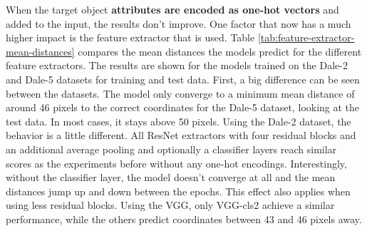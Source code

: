 When the target object \textbf{attributes are encoded as one-hot vectors} and added to the input, the results don't improve.
One factor that now has a much higher impact is the feature extractor that is used.
Table \ref{tab:feature-extractor-mean-distances} compares the mean distances the models predict for the different feature extractors.
The results are shown for the models trained on the Dale-2 and Dale-5 datasets for training and test data.
First, a big difference can be seen between the datasets.
The model only converge to a minimum mean distance of around 46 pixels to the correct coordinates for the Dale-5 dataset, looking at the test data.
In most cases, it stays above 50 pixels.
Using the Dale-2 dataset, the behavior is a little different.
All ResNet extractors with four residual blocks and an additional average pooling and optionally a classifier layers reach similar scores as the experiments before without any one-hot encodings.
Interestingly, without the classifier layer, the model doesn't converge at all and the mean distances jump up and down between the epochs.
This effect also applies when using less residual blocks.
Using the VGG, only VGG-cls2 achieve a similar performance, while the others predict coordinates between 43 and 46 pixels away.

